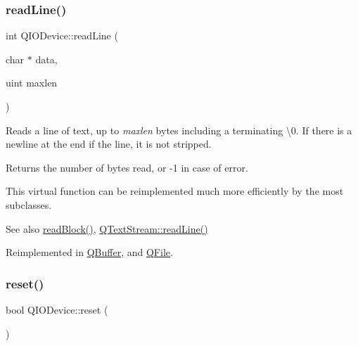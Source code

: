\mbox{\label{class_q_i_o_device_a4dc865ffcb5b7896ff8f9a1d828e4c0e}} 
\subsubsection{\texorpdfstring{readLine()}{readLine()}}
{\footnotesize\ttfamily int Q\+I\+O\+Device\+::read\+Line (\begin{DoxyParamCaption}\item[{char $\ast$}]{data,  }\item[{uint}]{maxlen }\end{DoxyParamCaption})\hspace{0.3cm}{\ttfamily [virtual]}}

Reads a line of text, up to {\itshape maxlen} bytes including a terminating \textbackslash{}0. If there is a newline at the end if the line, it is not stripped.

Returns the number of bytes read, or -\/1 in case of error.

This virtual function can be reimplemented much more efficiently by the most subclasses.

\begin{DoxySeeAlso}{See also}
\mbox{\hyperlink{class_q_i_o_device_a71f10647e4bd98141f45362b9a06983a}{read\+Block()}}, \mbox{\hyperlink{class_q_text_stream_a0bed0242d7c3f17289df88fdecad6afa}{Q\+Text\+Stream\+::read\+Line()}} 
\end{DoxySeeAlso}


Reimplemented in \mbox{\hyperlink{class_q_buffer_adcbf115b0d36683e6da2d3baa367382d}{Q\+Buffer}}, and \mbox{\hyperlink{class_q_file_af95c756ce6ff9f597ff1d21c8384d777}{Q\+File}}.

\mbox{\label{class_q_i_o_device_ac2f29866602352c08b3d3cb3f1fdc7e2}} 
\subsubsection{\texorpdfstring{reset()}{reset()}}
{\footnotesize\ttfamily bool Q\+I\+O\+Device\+::reset (\begin{DoxyParamCaption}{ }\end{DoxyParamCaption})\hspace{0.3cm}{\ttfamily [inline]}}


